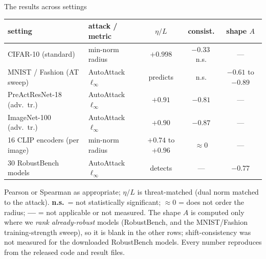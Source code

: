 \documentclass[aspectratio=169,10pt]{beamer}
\newcommand{\etaL}{\ensuremath{\eta/L}}
\newcommand{\key}[1]{{\color{TUMdarker}\bfseries #1}}
\newcommand{\good}[1]{{\color{good}#1}}
\newcommand{\bad}[1]{{\color{bad}#1}}
\begin{document}
\begin{frame}{The results across settings}{}
  \vspace{0.3em}
  \centering\small
  \begin{tabular}{llccc}
    \toprule
    setting & attack / metric & \good{$\etaL$} & \bad{consist.} & shape $A$\\
    \midrule
    CIFAR-10 (standard) & min-norm radius & $+0.998$ & $-0.33$\,n.s. & ---\\
    MNIST / Fashion (AT sweep) & AutoAttack $\ell_\infty$ & predicts & n.s. & $-0.61$ to $-0.89$\\
    PreActResNet-18 (adv.\ tr.) & AutoAttack $\ell_\infty$ & $+0.91$ & $-0.81$ & ---\\
    ImageNet-100 (adv.\ tr.) & AutoAttack $\ell_\infty$ & $+0.90$ & $-0.87$ & ---\\
    16 CLIP encoders (per image) & min-norm radius & $+0.74$ to $+0.96$ & $\approx0$ & ---\\
    30 RobustBench models & AutoAttack $\ell_\infty$ & detects & --- & $-0.77$\\
    \bottomrule
  \end{tabular}
  \vspace{0.4em}
  {\scriptsize\color{slate} Pearson or Spearman as appropriate; $\etaL$ is threat-matched (dual norm
  matched to the attack). \key{n.s.}\ = not statistically significant; \key{$\approx0$} = does not order
  the radius; \key{---} = not applicable or not measured. The shape $A$ is computed only where we
  \emph{rank already-robust} models (RobustBench, and the MNIST/Fashion training-strength sweep), so it is
  blank in the other rows; shift-consistency was not measured for the downloaded RobustBench models. Every
  number reproduces from the released code and result files.}
\end{frame}
\end{document}
